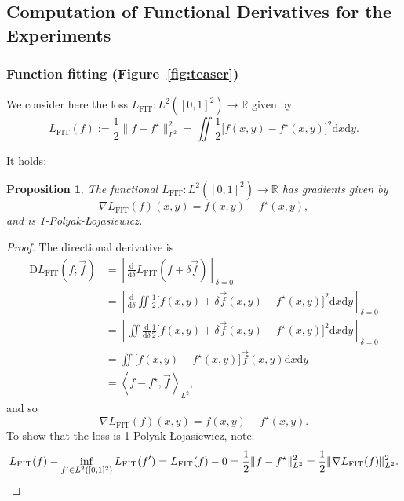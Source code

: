 \documentclass{article}
\newtheorem{proposition}[theorem]{Proposition}
\newcommand{\R}{\mathbb{R}}
\newcommand{\D}{\mathrm{D}}
\newcommand{\dif}{\mathrm{d}}
\begin{document}
\subsection{Computation of Functional Derivatives for the Experiments}

\subsubsection{Function fitting (Figure~\ref{fig:teaser})}

We consider here the loss $L_\mathrm{FIT} : L^2([0,1]^2) \to \R$ given by
\[ L_\mathrm{FIT}(f) := \frac{1}{2} \lVert f - f^\star \rVert_{L^2}^2 = \iint \frac{1}{2} \bigl[ f(x, y) - f^\star(x, y) \bigr]^2 \dif x \dif y. \]

It holds:

\begin{proposition}
    The functional $L_\mathrm{FIT} : L^2([0,1]^2) \to \R$ has gradients given by
    \[ \nabla L_\mathrm{FIT}(f)(x, y) = f(x, y) - f^\star(x, y), \]
    and is 1-Polyak-Łojasiewicz.
\end{proposition}
\begin{proof}
    The directional derivative is
    \begin{align*}
        \D L_\mathrm{FIT}(f; \vec{f})
        &= \left[ \frac{\dif}{\dif \delta} L_\mathrm{FIT}(f + \delta \vec{f}) \right]_{\delta=0}
        \\ &= \left[ \frac{\dif}{\dif \delta} \iint \frac{1}{2} \bigl[ f(x, y) + \delta \vec{f}(x, y) - f^\star(x, y) \bigr]^2 \dif x \dif y \right]_{\delta=0}
        \\ &= \left[ \iint \frac{\dif}{\dif \delta} \frac{1}{2} \bigl[ f(x, y) + \delta \vec{f}(x, y) - f^\star(x, y) \bigr]^2 \dif x \dif y \right]_{\delta=0}
        \\ &= \iint \bigl[ f(x, y) - f^\star(x, y) \bigr] \vec{f}(x, y) \dif x \dif y
        \\ &= \left\langle f - f^\star, \vec{f} \right\rangle_{L^2},
    \end{align*}
    and so
    \[ \nabla L_\mathrm{FIT}(f)(x, y) = f(x, y) - f^\star(x, y). \]
    To show that the loss is 1-Polyak-Łojasiewicz, note:
    \[
        L_\mathrm{FIT}(f) - \inf_{f' \in L^2([0,1]^2)} L_\mathrm{FIT}(f')
        = L_\mathrm{FIT}(f) - 0
        = \frac{1}{2} \lVert f - f^\star \rVert_{L^2}^2
        = \frac{1}{2} \lVert \nabla L_\mathrm{FIT}(f) \rVert_{L^2}^2.
        \qedhere
    \]
\end{proof}
\end{document}
